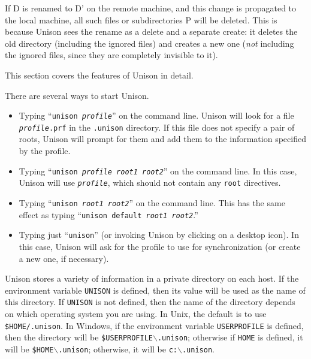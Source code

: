 \documentclass{article}
\newcommand{\NT}[1]{\textit{#1}}
\begin{document}
\begin{itemize}
 If D is renamed to D' on the remote machine, and this change is                
 propagated to the local machine, all such files or subdirectories P            
 will be deleted.  This is because Unison sees the rename as a delete and a
 separate create: it deletes the old directory (including the ignored files)
 and creates a new one ({\em not} including the ignored files, since they
 are completely invisible to it).
\end{itemize}




This section covers the features of Unison in detail.  


There are several ways to start Unison.
\begin{itemize}
\item Typing ``{\tt unison \NT{profile}}'' on the command line.  Unison
will look for a file \texttt{\NT{profile}.prf} in the \verb|.unison|
directory.  If this file does not specify a pair of roots, Unison will
prompt for them and add them to the information specified by the profile.
\item Typing ``{\tt unison \NT{profile} \NT{root1} \NT{root2}}'' on the command
line.
In this case, Unison will use {\tt \NT{profile}}, which should not contain
any {\tt root} directives.
\item Typing ``{\tt unison \NT{root1} \NT{root2}}'' on the command line.  This
has the same effect as typing ``{\tt unison default \NT{root1} \NT{root2}}.''
\item Typing just ``{\tt unison}'' (or invoking Unison by clicking on
a desktop icon).  In this case, Unison will ask for the profile to use
for synchronization (or create a new one, if necessary).   
\end{itemize}



Unison stores a variety of information in a private directory on each
host.  If the environment variable {\tt UNISON} is defined, then its
value will be used as the name of this directory.  If {\tt UNISON} is
not defined, then the name of the directory depends on which
operating system you are using.  In Unix, the default is to use
{\tt \$HOME/.unison}.
In Windows, if the environment variable
{\tt USERPROFILE} is defined, then the directory will be
{\tt \$USERPROFILE$\backslash$.unison};
otherwise if {\tt HOME} is defined, it will be
{\tt \$HOME$\backslash$.unison};
otherwise, it will be
{\tt c:$\backslash$.unison}.
\end{document}

